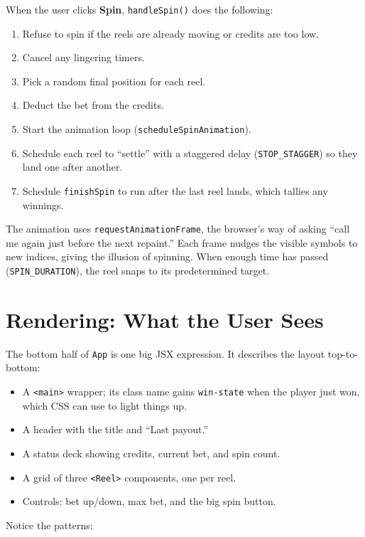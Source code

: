 \documentclass[11pt]{article}
\begin{document}
When the user clicks \textbf{Spin}, \texttt{handleSpin()} does the following:

\begin{enumerate}
  \item Refuse to spin if the reels are already moving or credits are too low.
  \item Cancel any lingering timers.
  \item Pick a random final position for each reel.
  \item Deduct the bet from the credits.
  \item Start the animation loop (\texttt{scheduleSpinAnimation}).
  \item Schedule each reel to ``settle'' with a staggered delay (\texttt{STOP\_STAGGER}) so they land one after another.
  \item Schedule \texttt{finishSpin} to run after the last reel lands, which tallies any winnings.
\end{enumerate}

The animation uses \texttt{requestAnimationFrame}, the browser's way of asking
``call me again just before the next repaint.'' Each frame nudges the
visible symbols to new indices, giving the illusion of spinning. When
enough time has passed (\texttt{SPIN\_DURATION}), the reel snaps to its predetermined target.

\section{Rendering: What the User Sees}

The bottom half of \texttt{App} is one big JSX expression.
It describes the layout top-to-bottom:

\begin{itemize}
  \item A \texttt{<main>} wrapper; its class name gains \texttt{win-state} when the player just won, which CSS can use to light things up.
  \item A header with the title and ``Last payout.''
  \item A status deck showing credits, current bet, and spin count.
  \item A grid of three \texttt{<Reel>} components, one per reel.
  \item Controls: bet up/down, max bet, and the big spin button.
\end{itemize}

Notice the patterns:
\end{document}
